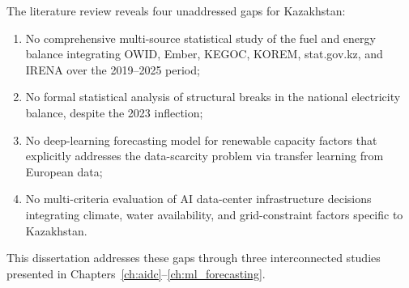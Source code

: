 The literature review reveals four unaddressed gaps for Kazakhstan:
\begin{enumerate}
    \item No comprehensive multi-source statistical study of the fuel and energy balance integrating OWID, Ember, KEGOC, KOREM, stat.gov.kz, and IRENA over the 2019--2025 period;
    \item No formal statistical analysis of structural breaks in the national electricity balance, despite the 2023 inflection;
    \item No deep-learning forecasting model for renewable capacity factors that explicitly addresses the data-scarcity problem via transfer learning from European data;
    \item No multi-criteria evaluation of AI data-center infrastructure decisions integrating climate, water availability, and grid-constraint factors specific to Kazakhstan.
\end{enumerate}
This dissertation addresses these gaps through three interconnected studies presented in Chapters~\ref{ch:aidc}--\ref{ch:ml_forecasting}.
